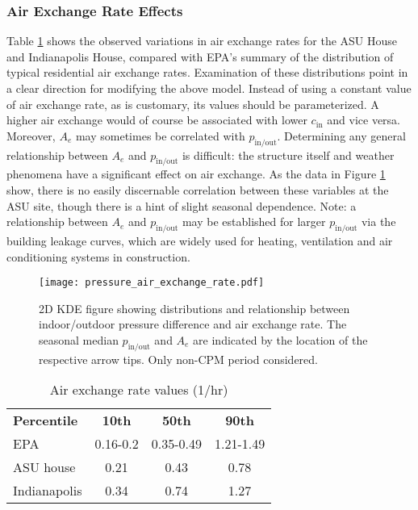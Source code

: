 \subsubsection{Air Exchange Rate Effects}\label{s:results_model_air_exchange}

Table \ref{tbl:air_exchange_rate} shows the observed variations in air exchange rates for the ASU House and Indianapolis House, compared with EPA’s summary of the distribution of typical residential air exchange rates\cite{u.s._epa_exposure_2011,m._d._koontz_estimation_1995}.
Examination of these distributions point in a clear direction for modifying the above model.
Instead of using a constant value of air exchange rate, as is customary, its values should be parameterized.
A higher air exchange would of course be associated with lower $c_\mathrm{in}$ and vice versa.
Moreover, $A_e$ may sometimes be correlated with $p_\mathrm{in/out}$.
Determining any general relationship between $A_e$ and $p_\mathrm{in/out}$ is difficult: the structure itself and weather phenomena have a significant effect on air exchange.
As the data in Figure \ref{fig:air_exchange_rate} show, there is no easily discernable correlation between these variables at the ASU site, though there is a hint of slight seasonal dependence.
Note: a relationship between $A_e$ and $p_\mathrm{in/out}$ may be established for larger $p_\mathrm{in/out}$ via the building leakage curves, which are widely used for heating, ventilation and air conditioning systems in construction.\par

\begin{figure}[htb!]
  \texttt{[image: pressure\_air\_exchange\_rate.pdf]}
  \caption{2D KDE figure showing distributions and relationship between indoor/outdoor pressure difference and air exchange rate. The seasonal median $p_\mathrm{in/out}$ and $A_e$ are indicated by the location of the respective arrow tips. Only non-CPM period considered.}\label{fig:air_exchange_rate}
\end{figure}

\begin{table}[htb!]
  \centering
  \begin{tabular}{l c c c}
    \toprule
    \textbf{Percentile}                                                     & \textbf{10th} & \textbf{50th} & \textbf{90th} \\
    EPA\cite{u.s._epa_exposure_2011,m._d._koontz_estimation_1995}           & 0.16-0.2      & 0.35-0.49     & 1.21-1.49     \\
    ASU house\cite{holton_temporal_2013,guo_identification_2015}            & 0.21          & 0.43          & 0.78          \\
    Indianapolis\cite{u.s._environmental_protection_agency_assessment_2015} & 0.34          & 0.74          & 1.27          \\
    \bottomrule
  \end{tabular}
  \caption{Air exchange rate values (1/hr)}\label{tbl:air_exchange_rate}
\end{table}

